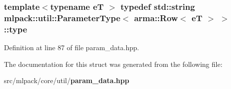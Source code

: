 \subsubsection[{type}]{\setlength{\rightskip}{0pt plus 5cm}template$<$typename eT $>$ typedef {\bf std\+::string} {\bf mlpack\+::util\+::\+Parameter\+Type}$<$ arma\+::\+Row$<$ eT $>$ $>$\+::{\bf type}}\label{structmlpack_1_1util_1_1ParameterType_3_01arma_1_1Row_3_01eT_01_4_01_4_ac7ab5028be5366766f555f357f704dc9}


Definition at line 87 of file param\+\_\+data.\+hpp.



The documentation for this struct was generated from the following file\+:\begin{DoxyCompactItemize}
\item 
src/mlpack/core/util/{\bf param\+\_\+data.\+hpp}\end{DoxyCompactItemize}
